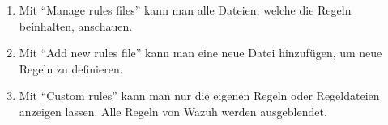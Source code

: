 \begin{enumerate}
    \item Mit ``Manage rules files'' kann man alle Dateien, welche die Regeln beinhalten, anschauen. 
    \item Mit ``Add new rules file'' kann man eine neue Datei hinzufügen, um neue Regeln zu definieren.
    \item Mit ``Custom rules'' kann man nur die eigenen Regeln oder Regeldateien anzeigen lassen. Alle Regeln von Wazuh werden ausgeblendet.
\end{enumerate}

